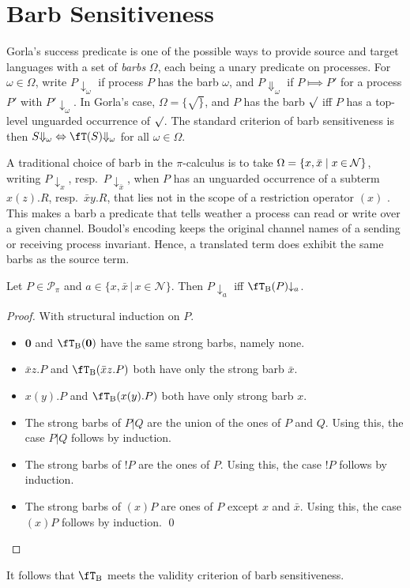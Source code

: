 \documentclass[runningheads]{llncs}
\newcommand{\T}{\mathcal{P}}             %
\newcommand{\bbT}{\T}
\newcommand{\N} {{\cal N}}               %
\renewcommand{\nu}{}
\newcommand{\trans}[1]{\fT(#1)}
\newcommand{\scomm}{\sbarb}
\newcommand{\sbarb}[1]{{\downarrow_{#1}}}
\newcommand{\pims}{\pi}
\newcommand{\sI}{\fT}
\begin{document}
\section{Barb Sensitiveness}\label{sec:barbs}

Gorla's success predicate is one of the possible ways to provide source and target languages with
a set of \emph{barbs} $\Omega$, each being a unary predicate on processes. For $\omega \in \Omega$,
write $P{\downarrow_\omega}$ if process $P$ has the barb $\omega$, and 
$P{\Downarrow_\omega}$ if $P\Longmapsto P'$ for a process $P'$ with $P'{\downarrow_\omega}$.
In Gorla's case, $\Omega=\{\surd\}$, and $P$ has the barb $\surd$ iff $P$ has a top-level unguarded
occurrence of $\surd$.
The standard criterion of barb sensitiveness is then
$S{\Downarrow_\omega} \Leftrightarrow \trans{S}{\Downarrow_\omega}$ for all $\omega\in\Omega$.

A traditional choice of barb in the $\pi$-calculus is to take $\Omega=\{x,\bar x \mid x\mathbin\in\N\}$,
writing $P{\downarrow_x}$, resp.\ $P{\downarrow_{\bar x}}$, when $P$ has an unguarded occurrence of
a subterm $x(z).R$, resp.\ $\bar xy.R$, that lies not in the scope of a restriction operator $\nu(x)$ \cite{milner:poly,SW01book}.
This makes a barb a predicate that tells weather a process can read or write over a given channel.
Boudol's encoding keeps the original channel names of a sending or receiving process invariant.
Hence, a translated term does exhibit the same barbs as the source term.
\begin{lemma}\label{lem:barbs}\rm
Let $P \in \bbT_{\pims}$ and $a \in \{ x, \bar x \,|\, x \in \mathcal N \}$.
Then $P \scomm a$ iff $\fT_{\rm B}(P) \scomm a$.
\end{lemma}
\begin{proof}
\renewcommand{\sI}{\fT_{\rm B}}
With structural induction on $P$.
\leftmargini 20pt
\begin{itemize}
\item $\bm{0}$ and $\sI(\bm{0})$ have the same strong barbs, namely none.%
\item $\bar xz.P$ and $\sI(\bar xz.P)$ both have only the strong barb $\bar x$.%
\item $x(y).P$ and $\sI(x(y).P)$ both have only strong barb $x$.%
\item The strong barbs of $P|Q$ are the union of the ones of $P$ and $Q$.
  Using this, the case $P|Q$ follows by induction.%
\item The strong barbs of $!P$ are the ones of $P$.
  Using this, the case $!P$ follows by induction.
\item The strong barbs of $(x)P$ are ones of $P$ except $x$ and $\bar x$.
  Using this, the case $(x)P$ follows by induction.
\qed
\end{itemize}
\end{proof}
It follows that $\fT_{\rm B}$ meets the validity criterion of barb sensitiveness.
\end{document}
